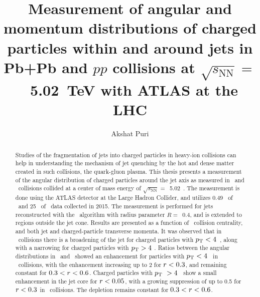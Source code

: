 \documentclass[fullpage]{uiucthesis2009}
\begin{document}
\title{Measurement of angular and momentum distributions of charged particles within and around jets in P\MakeLowercase{b}+P\MakeLowercase{b} and \MakeLowercase{$pp$} collisions at $\sqrt{s_{\mathrm{NN}}}=$~5.02~T\MakeLowercase{e}V with ATLAS at the LHC}
\author{Akshat Puri}
\phdthesis
{}
\maketitle

\frontmatter

\setcounter{page}{2}
\begin{abstract}

Studies of the fragmentation of jets into charged particles in heavy-ion collisions can help in understanding the mechanism of jet quenching by the hot and dense matter created in such collisions, the quark-gluon plasma. This thesis presents a measurement of the angular distribution of charged particles around the jet axis as measured in \pbpb\ and \pp\ collisions collided at a center of mass energy of $\sqrt{s_{\mathrm{NN}}}=$~5.02~\TeV. The measurement is done using the ATLAS detector at the Large Hadron Collider, and utilizes 0.49 \pb\ of \pbpb\ and 25 \pb\ of \pp\ data collected in 2015. The measurement is performed for jets reconstructed with the \antikt\ algorithm with radius parameter $R = $~0.4, and is extended to regions outside the jet cone. Results are presented as a function of \pbpb\ collision centrality, and both jet and charged-particle transverse momenta. It was observed that in \pbpb\ collisions there is a broadening of the jet for charged particles with \mbox{$\mbox{$p_{\mathrm{T}}$} < 4$ \GeV}, along with a narrowing for  charged particles with $\mbox{$p_{\mathrm{T}}$} > 4$ \GeV. Ratios between the angular distributions in \pbpb\ and \pp\ showed an enhancement for particles with $\mbox{$p_{\mathrm{T}}$} < 4$ \GeV\ in \pbpb\ collisions, with the enhancement increasing up to 2 for \mbox{$\mbox{$r$} < 0.3$}, and remaining constant for \mbox{$0.3 < \mbox{$r$} < 0.6$}. Charged particles with $\mbox{$p_{\mathrm{T}}$}\ > 4$ \GeV\ show a small enhancement in the jet core for $\mbox{$r$} < 0.05$, with a growing suppression of up to 0.5 for \mbox{$\mbox{$r$} < 0.3$} in \pbpb\ collisions. The depletion remains constant for \mbox{$0.3 < \mbox{$r$} < 0.6$}.
\end{abstract}
\end{document}
